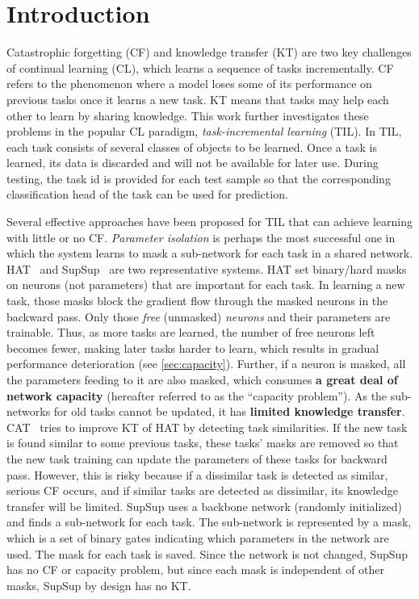 \section{Introduction} \label{sec:introduction}
Catastrophic forgetting (CF) and knowledge transfer (KT) are two key challenges of continual learning (CL), which learns a sequence of tasks incrementally. CF refers to the phenomenon where a model loses some of its performance on previous tasks once it learns a new task. KT means that tasks may help each other to learn by sharing knowledge.
This work further investigates these problems in the popular CL paradigm, \textit{task-incremental learning} (TIL). In TIL, each task consists of several classes of objects to be learned. Once a task is learned, its data is discarded and will not be available for later use. 
During testing, the task id is provided for each test sample so that the corresponding classification head of the task can be used for prediction.  


Several effective approaches have been proposed for TIL that can achieve learning with little or no CF. \textit{Parameter isolation} is perhaps the most successful one in which the system learns to mask a sub-network for each task in a shared network.
HAT~\citep{hat} and SupSup~\citep{supsup} are two representative systems.
HAT set binary/hard masks on neurons (not parameters) that are important for each task. In learning a new task, those masks block the gradient flow through the masked neurons in the backward pass. Only those \textit{free} (unmasked) \textit{neurons} and their parameters are trainable. Thus, as more tasks are learned, the number of free neurons left becomes fewer, making later tasks harder to learn, which results in gradual performance deterioration (see \cref{sec:capacity}). Further, if a neuron is masked, all the parameters feeding to it are also masked, which consumes \textbf{a great deal of network capacity} (hereafter referred to as the ``capacity problem''). 
As the sub-networks for old tasks cannot be updated, it has \textbf{limited knowledge transfer}.  
CAT~\citep{cat} tries to improve KT of HAT by detecting task similarities. If the new task is found similar to some previous tasks, these tasks' masks are removed so that the new task training can update the parameters of these tasks for backward pass. However, this is risky because if a dissimilar task is detected as similar, serious CF occurs, and if similar tasks are detected as dissimilar, its knowledge transfer will be limited.
SupSup uses a backbone network (randomly initialized) and finds a sub-network for each task. The sub-network is represented by a mask, which is a set of binary gates indicating which parameters in the network are used. The mask for each task is saved. Since the network is not changed, SupSup has no CF or capacity problem, but since each mask is independent of other masks, SupSup by design has no KT. 


